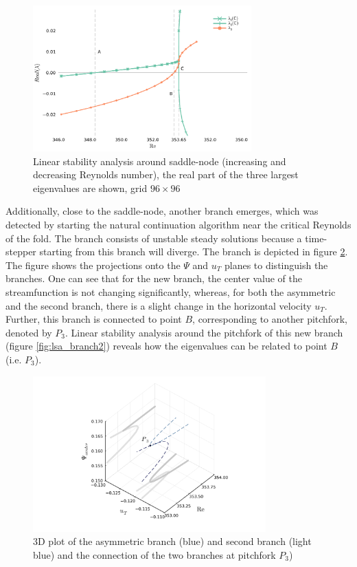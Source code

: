 \begin{figure}[h]
  \centering
  \includegraphics[width=0.75\textwidth]{figs/lsa_sn96x96.pdf}
  \caption{Linear stability analysis around saddle-node (increasing and
    decreasing Reynolds number), the real part of the three largest eigenvalues
    are shown, grid $96 \times 96$} 
  \label{fig:lsa}
\end{figure}

Additionally, close to the saddle-node, another branch emerges, which was
detected by starting the natural continuation algorithm near the critical
Reynolds of the fold. The branch consists of unstable steady solutions because
a time-stepper starting from this branch will diverge. The branch is depicted
in figure \ref{fig:branch2}. The figure shows the projections onto the $\Psi$
and $u_T$ planes to distinguish the branches. One can see that for the new
branch, the center value of the streamfunction is not changing significantly,
whereas, for both the asymmetric and the second branch, there is a slight
change in the horizontal velocity $u_T$. Further, this branch is connected to
point $B$, corresponding to another pitchfork, denoted by $P_3$. Linear
stability analysis around the pitchfork of this new branch (figure
\ref{fig:lsa_branch2}) reveals how the eigenvalues can be related to point $B$
(i.e. $P_3$).

\begin{figure}[h!]
  \centering
  \includegraphics[trim={0 0.8cm 0 0.5cm},clip,width=0.8\textwidth]{figs/branch2_64x64.pdf}
  \caption{3D plot of the asymmetric branch (blue) and second branch (light blue) and the
    connection of the two branches at pitchfork $P_3$)}
  \label{fig:branch2}
\end{figure}

